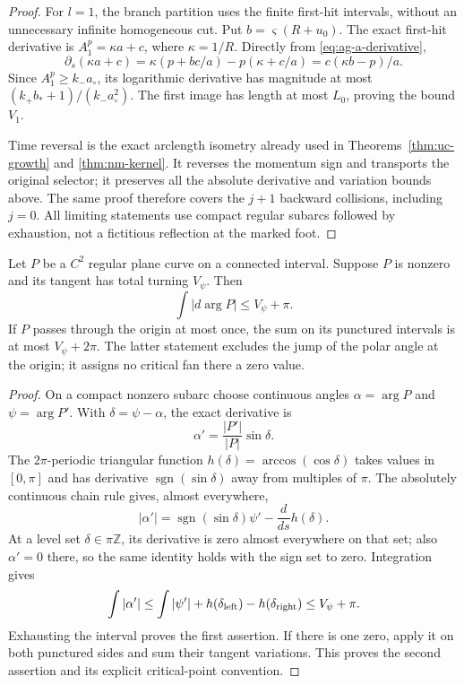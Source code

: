 \begin{proof}
For $l=1$, the branch partition uses the finite first-hit intervals,
without an unnecessary infinite homogeneous cut.  Put
$b=\varsigma(R+u_0)$.  The exact first-hit derivative is
$A_1^p=\kappa a+c$, where $\kappa=1/R$.  Directly from
\eqref{eq:ag-a-derivative},
\[
 \partial_s(\kappa a+c)
 =\kappa(p+bc/a)-p(\kappa+c/a)
 =c(\kappa b-p)/a.
\]
Since $A_1^p\ge k_-a_\circ$, its logarithmic derivative has magnitude
at most $(k_+b_*+1)/(k_-a_\circ^2)$.  The first image has length
at most $L_0$, proving the bound $V_1$.

Time reversal is the exact arclength isometry already used in
Theorems~\ref{thm:uc-growth} and \ref{thm:nm-kernel}.  It reverses
the momentum sign and transports the original selector; it preserves
all the absolute derivative and variation bounds above.  The same
proof therefore covers the $j+1$ backward collisions, including
$j=0$.  All limiting statements use compact regular subarcs followed
by exhaustion, not a fictitious reflection at the marked foot.
\end{proof}

\begin{lemma}
\label{lem:ab-radial-turning}
Let $P$ be a $C^2$ regular plane curve on a connected interval.
Suppose $P$ is nonzero and its tangent has total turning $V_\psi$.
Then
\begin{equation}\label{eq:ab-radial-turning}
           \int |d\arg P|\le V_\psi+\pi.
\end{equation}
If $P$ passes through the origin at most once, the sum on its punctured
intervals is at most $V_\psi+2\pi$.  The latter statement excludes
the jump of the polar angle at the origin; it assigns no critical fan
there a zero value.
\end{lemma}
\begin{proof}
On a compact nonzero subarc choose continuous angles
$\alpha=\arg P$ and $\psi=\arg P'$.  With
$\delta=\psi-\alpha$, the exact derivative is
\[
         \alpha'=\frac{|P'|}{|P|}\sin\delta.
\]
The $2\pi$-periodic triangular function
$h(\delta)=\arccos(\cos\delta)$ takes values in $[0,\pi]$ and
has derivative $\operatorname{sgn}(\sin\delta)$ away from multiples
of $\pi$.  The absolutely continuous chain rule gives, almost
everywhere,
\[
 |\alpha'|
   =\operatorname{sgn}(\sin\delta)\psi'
                                -\frac{d}{ds}h(\delta).
\]
At a level set $\delta\in\pi\mathbb Z$, its derivative is zero
almost everywhere on that set; also $\alpha'=0$ there, so the same
identity holds with the sign set to zero.  Integration gives
\[
 \int|\alpha'|
 \le\int|\psi'|+h(\delta_{\rm left})-h(\delta_{\rm right})
 \le V_\psi+\pi.
\]
Exhausting the interval proves the first assertion.  If there is
one zero, apply it on both punctured sides and sum their tangent
variations.  This proves the second assertion and its explicit
critical-point convention.
\end{proof}

